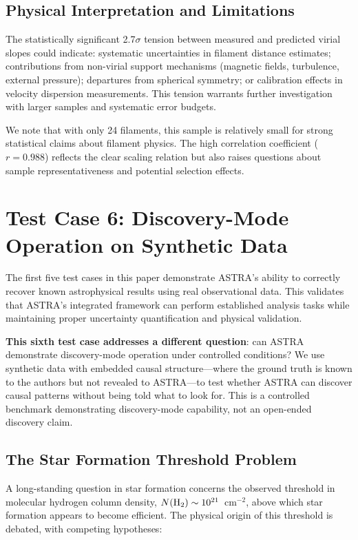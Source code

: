 \documentclass[usenatbib]{rasti}
\begin{document}
\subsection{Physical Interpretation and Limitations}

The statistically significant 2.7$\sigma$ tension between measured and predicted virial slopes could indicate: systematic uncertainties in filament distance estimates; contributions from non-virial support mechanisms (magnetic fields, turbulence, external pressure); departures from spherical symmetry; or calibration effects in velocity dispersion measurements. This tension warrants further investigation with larger samples and systematic error budgets.

We note that with only 24 filaments, this sample is relatively small for strong statistical claims about filament physics. The high correlation coefficient ($r = 0.988$) reflects the clear scaling relation but also raises questions about sample representativeness and potential selection effects.

\section{Test Case 6: Discovery-Mode Operation on Synthetic Data}

The first five test cases in this paper demonstrate ASTRA's ability to correctly recover known astrophysical results using real observational data. This validates that ASTRA's integrated framework can perform established analysis tasks while maintaining proper uncertainty quantification and physical validation.

\textbf{This sixth test case addresses a different question}: can ASTRA demonstrate discovery-mode operation under controlled conditions? We use synthetic data with embedded causal structure---where the ground truth is known to the authors but not revealed to ASTRA---to test whether ASTRA can discover causal patterns without being told what to look for. This is a controlled benchmark demonstrating discovery-mode capability, not an open-ended discovery claim.

\subsection{The Star Formation Threshold Problem}

A long-standing question in star formation concerns the observed threshold in molecular hydrogen column density, $N({\rm H_2}) \sim 10^{21}$~cm$^{-2}$, above which star formation appears to become efficient. The physical origin of this threshold is debated, with competing hypotheses:
\end{document}
